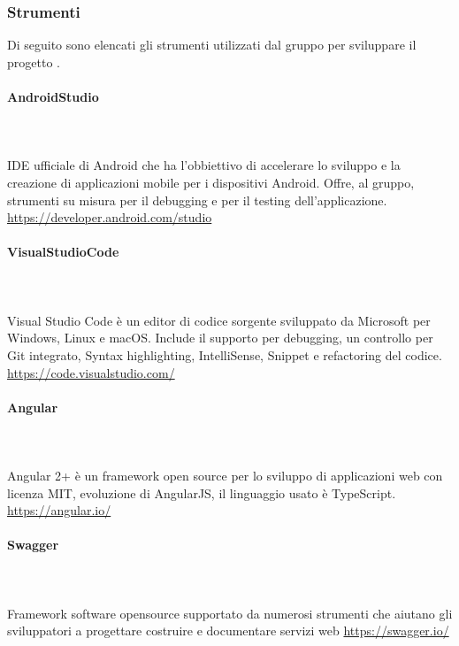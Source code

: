 \subsubsection{Strumenti}
Di seguito sono elencati gli strumenti utilizzati dal gruppo per sviluppare il progetto .

\paragraph{AndroidStudio}\mbox{}\\ \\
IDE ufficiale di Android che ha l'obbiettivo di accelerare lo sviluppo e la creazione di applicazioni mobile per i dispositivi Android.
Offre, al gruppo,  strumenti su misura per il debugging e per il testing dell'applicazione.
\href{https://developer.android.com/studio}{https://developer.android.com/studio}

\paragraph{VisualStudioCode}\mbox{}\\ \\
Visual Studio Code è un editor di codice sorgente sviluppato da Microsoft per Windows, Linux e macOS. Include il supporto per debugging, un controllo per Git integrato, Syntax highlighting, IntelliSense, Snippet e refactoring del codice.
\href{https://code.visualstudio.com/}{https://code.visualstudio.com/}

\paragraph{Angular}\mbox{}\\ \\
Angular 2+ è un framework open source per lo sviluppo di applicazioni web con licenza MIT, evoluzione di AngularJS, il linguaggio usato è TypeScript.
\href{https://angular.io/}{https://angular.io/}

\paragraph{Swagger}\mbox{}\\ \\
Framework software opensource supportato da numerosi strumenti che aiutano gli sviluppatori a progettare costruire e documentare servizi web 
\href{https://swagger.io/}{https://swagger.io/}

